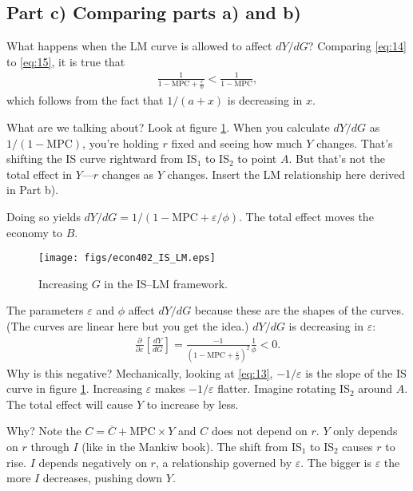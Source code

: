 \documentclass[12pt]{pracjourn_rwr}
\theoremstyle{definition}
\theoremstyle{remark}
\begin{document}
\subsection{Part c) Comparing parts a) and b)}

What happens when the LM curve is allowed to affect $dY / dG$?
Comparing \eqref{eq:14} to \eqref{eq:15}, it is true that
\begin{align*}
\frac{1}{1 - \text{MPC} + \frac{\varepsilon}{\phi}} < \frac{1}{1-\text{MPC}},
\end{align*}
which follows from the fact that $1 / (a +x)$ is decreasing in $x$.

What are we talking about?
Look at figure \ref{fig:is-lm}.
When you calculate $d Y/ dG$ as $1/(1-\text{MPC})$,
you're holding $r$ fixed and seeing how much $Y$ changes.
That's shifting the IS curve rightward from IS$_{1}$ to IS$_{2}$ to point $A$.
But that's not the total effect in $Y$---$r$ changes as $Y$ changes.
Insert the LM relationship here derived in Part b).

Doing so yields $d Y/ d G = 1 / ( 1 - \text{MPC} + \varepsilon / \phi)$.
The total effect moves the economy to $B$.

\begin{figure}[htbp]
\centerline{\texttt{[image: figs/econ402\_IS\_LM.eps]}}
\caption[]{\label{fig:is-lm} Increasing $G$ in the IS--LM framework.}
\end{figure}

The parameters $\varepsilon$ and $\phi$ affect $d Y/ d G$ because these are the shapes of the curves.
(The curves are linear here but you get the idea.)
$d Y / d G$ is decreasing in $\varepsilon$:
\begin{align*}
\frac{\partial}{\partial \varepsilon} \left[ \frac{d Y}{d G} \right] =
\frac{-1}{\left( 1 - \text{MPC} + \frac{\varepsilon}{\phi} \right)^{2}} \frac{1}{\phi} < 0.
\end{align*}
Why is this negative?
Mechanically, looking at \eqref{eq:13},
$-1 / \varepsilon$ is the slope of the IS curve in figure \ref{fig:is-lm}.
Increasing $\varepsilon$ makes $-1/\varepsilon$ flatter.
Imagine rotating IS$_{2}$ around $A$.
The total effect will cause $Y$ to increase by less.

Why?
Note the $C = \overline{C} + \text{MPC} \times Y$ and $C$ does not depend on $r$.
$Y$ only depends on $r$ through $I$ (like in the Mankiw book).
The shift from IS$_{1}$ to IS$_{2}$ causes $r$ to rise.
$I$ depends negatively on $r$, a relationship governed by $\varepsilon$.
The bigger is $\varepsilon$ the more $I$ decreases, pushing down $Y$.
\end{document}
